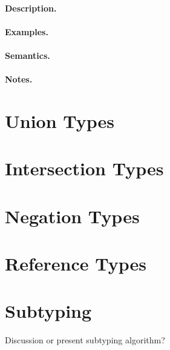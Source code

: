 \paragraph{Description.}

\paragraph{Examples.}

\paragraph{Semantics.}

\paragraph{Notes.} 

\section{Union Types}
\section{Intersection Types}
\section{Negation Types}
\section{Reference Types}
\section{Subtyping}
Discussion or present subtyping algorithm?

